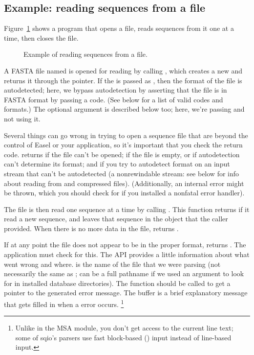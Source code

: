 \subsection{Example: reading sequences from a file}

Figure~\ref{fig:sqio_example} shows a program that opens a file, reads
sequences from it one at a time, then closes the file.

\begin{figure}

\caption{Example of reading sequences from a file.}
\label{fig:sqio_example}
\end{figure}

A FASTA file named  is opened for reading by calling
, which
creates a new  and returns it through the
 pointer. If the  is passed as
, then the format of the file is
autodetected; here, we bypass autodetection by asserting that the file
is in FASTA format by passing a  code. (See
below for a list of valid codes and formats.) The optional 
argument is described below too; here, we're passing  and
not using it.

Several things can go wrong in trying to open a sequence file that are
beyond the control of Easel or your application, so it's important
that you check the return code.   returns
 if the file can't be opened; 
if the file is empty, or if autodetection can't determine its format;
and  if you try to autodetect format on an input
stream that can't be autodetected (a nonrewindable stream: see below
for info about reading from  and compressed
files). (Additionally, an internal error might be thrown, which you
should check for if you installed a nonfatal error handler).

The file is then read one sequence at a time by calling
. This function returns 
if it read a new sequence, and leaves that sequence in the 
object that the caller provided.  When there is no more data in the
file,  returns . 

If at any point the file does not appear to be in the proper format,
 returns . The application
must check for this. The API provides a little information about what
went wrong and where.  is the name of the file
that we were parsing (not necessarily the same as ;
 can be a full pathname if we used an
 argument to look for  in installed database
directories). The function  should be
called to get a pointer to the generated error message.  The buffer
 is a brief explanatory message that gets filled in when a 
 error occurs.
  \footnote{Unlike in the MSA module, you don't get access to the
  current line text; some of sqio's parsers use fast block-based
  () input instead of line-based input.}

